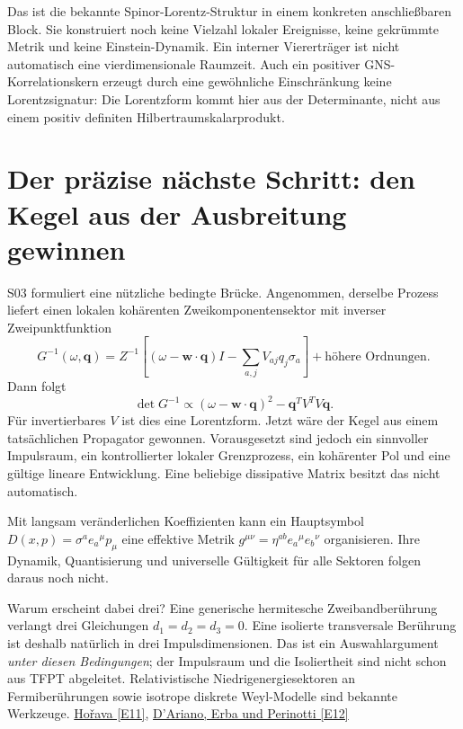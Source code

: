Das ist die bekannte Spinor-Lorentz-Struktur in einem konkreten anschließbaren Block. Sie konstruiert noch keine Vielzahl lokaler Ereignisse, keine gekrümmte Metrik und keine Einstein-Dynamik. Ein interner Viererträger ist nicht automatisch eine vierdimensionale Raumzeit. Auch ein positiver GNS-Korrelationskern erzeugt durch eine gewöhnliche Einschränkung keine Lorentzsignatur: Die Lorentzform kommt hier aus der Determinante, nicht aus einem positiv definiten Hilbertraumskalarprodukt. 

\section{Der präzise nächste Schritt: den Kegel aus der Ausbreitung gewinnen}


S03 formuliert eine nützliche bedingte Brücke. Angenommen, derselbe Prozess liefert einen lokalen kohärenten Zweikomponentensektor mit inverser Zweipunktfunktion
\begin{equation}
G^{-1}(\omega,\mathbf q)=Z^{-1}
\left[(\omega-\mathbf w\cdot\mathbf q)I-\sum_{a,j}V_{aj}q_j\sigma_a\right]
+\text{höhere Ordnungen}.
\end{equation}
Dann folgt
\begin{equation}
\det G^{-1}\propto(\omega-\mathbf w\cdot\mathbf q)^2-\mathbf q^TV^TV\mathbf q.
\end{equation}
Für invertierbares $V$ ist dies eine Lorentzform. Jetzt wäre der Kegel aus einem tatsächlichen Propagator gewonnen. Vorausgesetzt sind jedoch ein sinnvoller Impulsraum, ein kontrollierter lokaler Grenzprozess, ein kohärenter Pol und eine gültige lineare Entwicklung. Eine beliebige dissipative Matrix besitzt das nicht automatisch.

Mit langsam veränderlichen Koeffizienten kann ein Hauptsymbol $D(x,p)=\sigma^ae_a{}^\mu p_\mu$ eine effektive Metrik $g^{\mu\nu}=\eta^{ab}e_a{}^\mu e_b{}^\nu$ organisieren. Ihre Dynamik, Quantisierung und universelle Gültigkeit für alle Sektoren folgen daraus noch nicht.

Warum erscheint dabei drei? Eine generische hermitesche Zweibandberührung verlangt drei Gleichungen $d_1=d_2=d_3=0$. Eine isolierte transversale Berührung ist deshalb natürlich in drei Impulsdimensionen. Das ist ein Auswahlargument \emph{unter diesen Bedingungen}; der Impulsraum und die Isoliertheit sind nicht schon aus TFPT abgeleitet. Relativistische Niedrigenergiesektoren an Fermiberührungen sowie isotrope diskrete Weyl-Modelle sind bekannte Werkzeuge. \href{https://arxiv.org/abs/hep-th/0503006}{Hořava [E11]}, \href{https://arxiv.org/abs/1708.00826}{D'Ariano, Erba und Perinotti [E12]}

